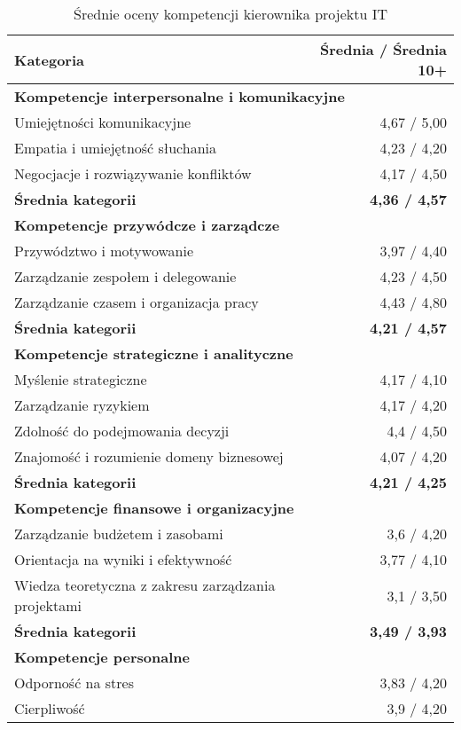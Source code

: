 \begin{table}[htbp]
\centering
\caption{Średnie oceny kompetencji kierownika projektu IT}
\begin{tabular}{p{9cm} r}
\toprule
\textbf{Kategoria} & \textbf{Średnia / Średnia 10+} \\
\midrule
\multicolumn{2}{l}{\textbf{Kompetencje interpersonalne i komunikacyjne}} \\
Umiejętności komunikacyjne & 4{,}67 / 5{,}00 \\
Empatia i umiejętność słuchania & 4{,}23 / 4{,}20 \\
Negocjacje i rozwiązywanie konfliktów & 4{,}17 / 4{,}50 \\
\textbf{Średnia kategorii} & \textbf{4{,}36 / 4{,}57} \\  
\midrule
\multicolumn{2}{l}{\textbf{Kompetencje przywódcze i zarządcze}} \\
Przywództwo i motywowanie & 3{,}97 / 4{,}40 \\
Zarządzanie zespołem i delegowanie & 4{,}23 / 4{,}50 \\
Zarządzanie czasem i organizacja pracy & 4{,}43 / 4{,}80 \\
\textbf{Średnia kategorii} & \textbf{4{,}21 / 4{,}57} \\
\midrule
\multicolumn{2}{l}{\textbf{Kompetencje strategiczne i analityczne}} \\
Myślenie strategiczne & 4{,}17 / 4{,}10 \\
Zarządzanie ryzykiem & 4{,}17 / 4{,}20 \\
Zdolność do podejmowania decyzji & 4{,}4 / 4{,}50 \\
Znajomość i rozumienie domeny biznesowej & 4{,}07 / 4{,}20 \\
\textbf{Średnia kategorii} & \textbf{4{,}21 / 4{,}25} \\
\midrule
\multicolumn{2}{l}{\textbf{Kompetencje finansowe i organizacyjne}} \\
Zarządzanie budżetem i zasobami & 3{,}6 / 4{,}20 \\
Orientacja na wyniki i efektywność & 3{,}77 / 4{,}10 \\
Wiedza teoretyczna z zakresu zarządzania projektami & 3{,}1 / 3{,}50 \\
\textbf{Średnia kategorii} & \textbf{3{,}49 / 3{,}93} \\
\midrule
\multicolumn{2}{l}{\textbf{Kompetencje personalne}} \\
Odporność na stres & 3{,}83 / 4{,}20 \\
Cierpliwość & 3{,}9 / 4{,}20 \\

\end{tabular}
\end{table}
